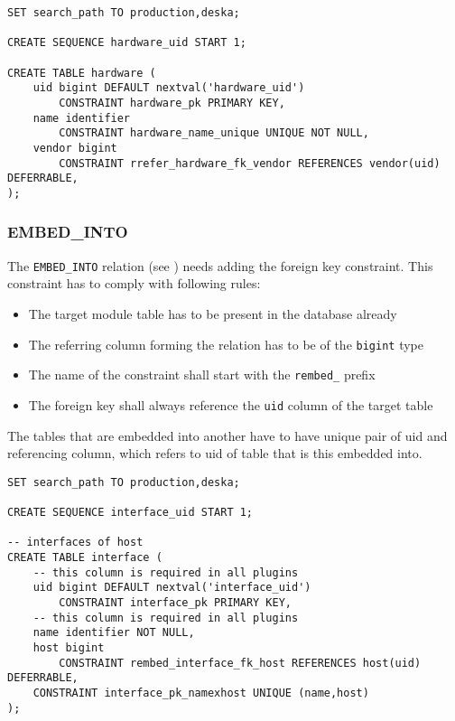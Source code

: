 \documentclass[deska]{subfiles}
\begin{document}
\begin{verbatim}
SET search_path TO production,deska;

CREATE SEQUENCE hardware_uid START 1;

CREATE TABLE hardware (
    uid bigint DEFAULT nextval('hardware_uid')
        CONSTRAINT hardware_pk PRIMARY KEY,
    name identifier
        CONSTRAINT hardware_name_unique UNIQUE NOT NULL,
    vendor bigint 
        CONSTRAINT rrefer_hardware_fk_vendor REFERENCES vendor(uid) DEFERRABLE,
);
\end{verbatim}

\subsubsection{EMBED\_INTO}
The {\tt EMBED\_INTO} relation (see ) needs adding the foreign key constraint. This constraint has to comply with following rules:
\begin{itemize}
    \item The target module table has to be present in the database already
    \item The referring column forming the relation has to be of the {\tt bigint} type
    \item The name of the constraint shall start with the {\tt rembed\_} prefix
    \item The foreign key shall always reference the {\tt uid} column of the target table
\end{itemize}
The tables that are embedded into another have to have unique pair of uid and referencing column, which refers to uid of table that is this embedded into.
\begin{verbatim}
SET search_path TO production,deska;

CREATE SEQUENCE interface_uid START 1;

-- interfaces of host
CREATE TABLE interface (
    -- this column is required in all plugins
    uid bigint DEFAULT nextval('interface_uid')
        CONSTRAINT interface_pk PRIMARY KEY,
    -- this column is required in all plugins
    name identifier NOT NULL,
    host bigint
        CONSTRAINT rembed_interface_fk_host REFERENCES host(uid) DEFERRABLE,
    CONSTRAINT interface_pk_namexhost UNIQUE (name,host)
);
\end{verbatim}
\end{document}
